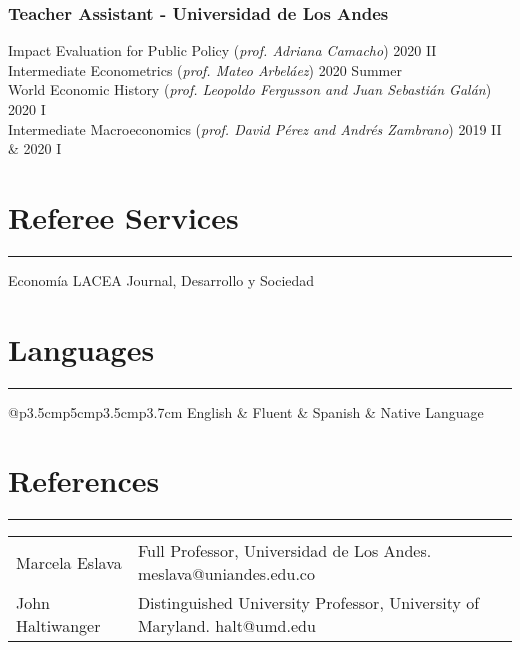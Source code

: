 \documentclass[12pt, letterpaper]{article}
\begin{document}
\subsubsection*{Teacher Assistant - Universidad de Los Andes}
\vspace*{-1mm}
\noindent
Impact Evaluation for Public Policy  \hspace{5mm} (\textit{prof. Adriana Camacho}) \hfill 2020 II \\
Intermediate Econometrics  \hspace{5mm} (\textit{prof. Mateo Arbeláez}) \hfill 2020 Summer \\
World Economic History  \hspace{5mm} (\small{\textit{prof. Leopoldo Fergusson and Juan Sebastián Galán}})  \hfill  2020 I  \\
Intermediate Macroeconomics \hspace{5mm}  (\textit{prof. David Pérez and Andrés Zambrano}) \hfill 2019 II \& 2020 I \\

\vspace*{-5mm}

\section*{Referee Services}
\vspace*{-8mm}
\noindent \rule{\linewidth}{0.2mm}
\noindent Economía LACEA Journal, Desarrollo y Sociedad

\vspace{-4mm}

\section*{Languages}
\vspace*{-8mm}
\noindent \rule{\linewidth}{0.2mm}
\noindent
\begin{tabular}{@{}p{3.5cm}p{5cm}p{3.5cm}p{3.7cm}}
English & Fluent	&  Spanish & Native Language \\
\end{tabular}

\vspace{-4mm}

\section*{References}
\vspace*{-8mm}
\noindent \rule{\linewidth}{0.2mm}
\noindent
\begin{tabular}{@{}p{3.5cm}p{13.7cm}}
\\ [-3mm]
Marcela Eslava & Full Professor, Universidad de Los Andes. meslava@uniandes.edu.co \\ [3mm]
John Haltiwanger & Distinguished University Professor, University of Maryland. halt@umd.edu \\ [4mm]
\end{tabular}
\end{document}
